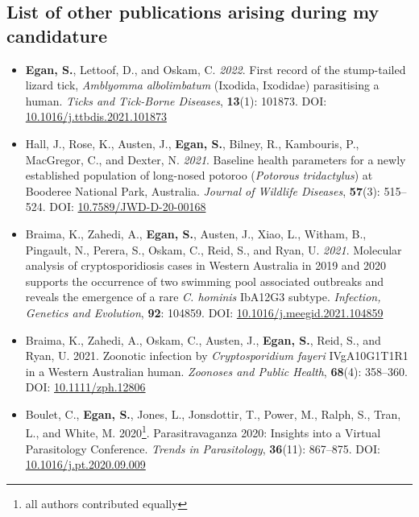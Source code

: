 \documentclass[a4paper, nobind]{templates/ociamthesis}
\providecommand{\tightlist}{%
  \setlength{\itemsep}{0pt}\setlength{\parskip}{0pt}}
\begin{document}
\hypertarget{list-of-other-publications-arising-during-my-candidature}{%
\subsection*{List of other publications arising during my candidature}\label{list-of-other-publications-arising-during-my-candidature}}

\begin{itemize}
\tightlist
\item
  \textbf{Egan, S.}, Lettoof, D., and Oskam, C. \emph{2022}. First record of the stump-tailed lizard tick, \emph{Amblyomma} \emph{albolimbatum} (Ixodida, Ixodidae) parasitising a human. \emph{Ticks and Tick-Borne Diseases}, \textbf{13}(1): 101873. DOI: \href{https://doi.org/10.1016/j.ttbdis.2021.101873}{10.1016/j.ttbdis.2021.101873}
\item
  Hall, J., Rose, K., Austen, J., \textbf{Egan, S.}, Bilney, R., Kambouris, P., MacGregor, C., and Dexter, N. \emph{2021}. Baseline health parameters for a newly established population of long-nosed potoroo (\emph{Potorous tridactylus}) at Booderee National Park, Australia. \emph{Journal of Wildlife Diseases}, \textbf{57}(3): 515--524. DOI: \href{https://doi.org/10.7589/JWD-D-20-00168}{10.7589/JWD-D-20-00168}
\item
  Braima, K., Zahedi, A., \textbf{Egan, S.}, Austen, J., Xiao, L., Witham, B., Pingault, N., Perera, S., Oskam, C., Reid, S., and Ryan, U. \emph{2021}. Molecular analysis of cryptosporidiosis cases in Western Australia in 2019 and 2020 supports the occurrence of two swimming pool associated outbreaks and reveals the emergence of a rare \emph{C. hominis} IbA12G3 subtype. \emph{Infection, Genetics and Evolution}, \textbf{92}: 104859. DOI: \href{https://doi.org/10.1016/j.meegid.2021.104859}{10.1016/j.meegid.2021.104859}
\item
  Braima, K., Zahedi, A., Oskam, C., Austen, J., \textbf{Egan, S.}, Reid, S., and Ryan, U. 2021. Zoonotic infection by \emph{Cryptosporidium fayeri} IVgA10G1T1R1 in a Western Australian human. \emph{Zoonoses and Public Health}, \textbf{68}(4): 358--360. DOI: \href{https://doi.org/10.1111/zph.12806}{10.1111/zph.12806}
\item
  Boulet, C., \textbf{Egan, S.}, Jones, L., Jonsdottir, T., Power, M., Ralph, S., Tran, L., and White, M. 2020\footnote{all authors contributed equally}. Parasitravaganza 2020: Insights into a Virtual Parasitology Conference. \emph{Trends in Parasitology}, \textbf{36}(11): 867--875. DOI: \href{https://doi.org/10.1016/j.pt.2020.09.009}{10.1016/j.pt.2020.09.009}

\end{itemize}
\end{document}
